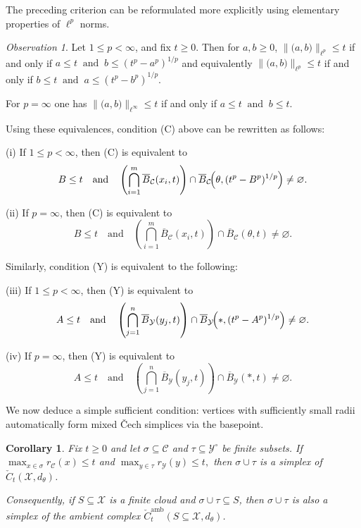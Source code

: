 \documentclass[11pt]{amsart}
\newtheorem{corollary}[theorem]{Corollary}
\theoremstyle{definition}
\theoremstyle{remark}
\newtheorem{observation}[theorem]{Observation}
\newcommand{\1}{\mathbbm{1}}
\begin{document}
The preceding criterion can be reformulated more explicitly using elementary properties of $\ell^p$ norms.

\begin{observation}
Let $1\le p<\infty$, and fix $t\ge 0$.
Then for $a,b\ge 0$, $\bigl\|\bigl(a,b\bigr)\bigr\|_{\ell^p}\le t$ if and only if 
$a\le t\ \text{ and }\ b\le (t^p-a^p)^{1/p}$
and equivalently $\bigl\|\bigl(a,b\bigr)\bigr\|_{\ell^p}\le t$
if and only if 
$b\le t\ \text{ and }\ a\le (t^p-b^p)^{1/p}.$

For $p=\infty$ one has
$\bigl\|\bigl(a,b\bigr)\bigr\|_{\ell^\infty}\le t$ if and only if
$a\le t\ \text{ and }\ b\le t.$

Using these equivalences, condition \textup{(C)} above can be rewritten as follows:

\smallskip\noindent
\textup{(i)} If $1\le p<\infty$, then \textup{(C)} is equivalent to
\[
B\le t
\quad\text{and}\quad
\left(\bigcap_{i=1}^m \overline{B}_{\mathcal C}(x_i,t)\right)
\cap
\overline{B}_{\mathcal C}\!\Bigl(\theta,(t^p-B^p)^{1/p}\Bigr)\neq\varnothing.
\]

\smallskip\noindent
\textup{(ii)} If $p=\infty$, then \textup{(C)} is equivalent to
\[
B\le t
\quad\text{and}\quad
\left(\bigcap_{i=1}^m \overline{B}_{\mathcal C}(x_i,t)\right)
\cap
\overline{B}_{\mathcal C}(\theta,t)\neq\varnothing.
\]

\smallskip\noindent
Similarly, condition \textup{(Y)} is equivalent to the following:

\smallskip\noindent
\textup{(iii)} If $1\le p<\infty$, then \textup{(Y)} is equivalent to
\[
A\le t
\quad\text{and}\quad
\left(\bigcap_{j=1}^n \overline{B}_{\mathcal Y}(y_j,t)\right)
\cap
\overline{B}_{\mathcal Y}\!\Bigl(\ast,(t^p-A^p)^{1/p}\Bigr)\neq\varnothing.
\]

\smallskip\noindent
\textup{(iv)} If $p=\infty$, then \textup{(Y)} is equivalent to
\[
A\le t
\quad\text{and}\quad
\left(\bigcap_{j=1}^n \overline{B}_{\mathcal Y}(y_j,t)\right)
\cap
\overline{B}_{\mathcal Y}(\ast,t)\neq\varnothing.
\]
\end{observation}

We now deduce a simple sufficient condition: vertices with sufficiently small radii automatically form mixed \v{C}ech simplices via the basepoint.

\begin{corollary}
\label{cor:basepoint-sufficient}
Fix $t\ge 0$ and let $\sigma\subseteq\mathcal C$ and $\tau\subseteq\mathcal Y^\circ$ be finite subsets.
If $\max_{x\in\sigma} r_{\mathcal C}(x)\le t$ and
$\max_{y\in\tau} r_{\mathcal Y}(y)\le t,$
then $\sigma\cup\tau$ is a simplex of $\check{C}_t(\mathcal X,d_\theta)$.

Consequently, if $S\subseteq\mathcal X$ is a finite cloud and $\sigma\cup\tau\subseteq S$,
then $\sigma\cup\tau$ is also a simplex of the ambient complex
$\check{C}^{\mathrm{amb}}_t(S\subseteq\mathcal X,d_\theta)$.
\end{corollary}
\end{document}
